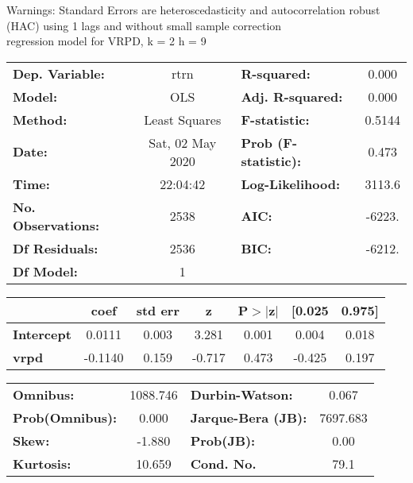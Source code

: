 Warnings: \newline
 [1] Standard Errors are heteroscedasticity and autocorrelation robust (HAC) using 1 lags and without small sample correction\\ 

regression model for VRPD, k = 2 h = 9\begin{center}
\begin{tabular}{lclc}
\toprule
\textbf{Dep. Variable:}    &       rtrn       & \textbf{  R-squared:         } &     0.000   \\
\textbf{Model:}            &       OLS        & \textbf{  Adj. R-squared:    } &     0.000   \\
\textbf{Method:}           &  Least Squares   & \textbf{  F-statistic:       } &    0.5144   \\
\textbf{Date:}             & Sat, 02 May 2020 & \textbf{  Prob (F-statistic):} &    0.473    \\
\textbf{Time:}             &     22:04:42     & \textbf{  Log-Likelihood:    } &    3113.6   \\
\textbf{No. Observations:} &        2538      & \textbf{  AIC:               } &    -6223.   \\
\textbf{Df Residuals:}     &        2536      & \textbf{  BIC:               } &    -6212.   \\
\textbf{Df Model:}         &           1      & \textbf{                     } &             \\
\bottomrule
\end{tabular}
\begin{tabular}{lcccccc}
                   & \textbf{coef} & \textbf{std err} & \textbf{z} & \textbf{P$> |$z$|$} & \textbf{[0.025} & \textbf{0.975]}  \\
\midrule
\textbf{Intercept} &       0.0111  &        0.003     &     3.281  &         0.001        &        0.004    &        0.018     \\
\textbf{vrpd}      &      -0.1140  &        0.159     &    -0.717  &         0.473        &       -0.425    &        0.197     \\
\bottomrule
\end{tabular}
\begin{tabular}{lclc}
\textbf{Omnibus:}       & 1088.746 & \textbf{  Durbin-Watson:     } &    0.067  \\
\textbf{Prob(Omnibus):} &   0.000  & \textbf{  Jarque-Bera (JB):  } & 7697.683  \\
\textbf{Skew:}          &  -1.880  & \textbf{  Prob(JB):          } &     0.00  \\
\textbf{Kurtosis:}      &  10.659  & \textbf{  Cond. No.          } &     79.1  \\
\bottomrule
\end{tabular}
\end{center}

